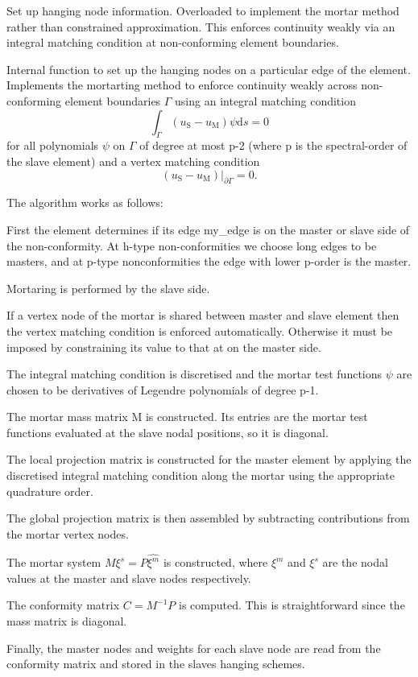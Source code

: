 Set up hanging node information. Overloaded to implement the mortar method rather than constrained approximation. This enforces continuity weakly via an integral matching condition at non-\/conforming element boundaries. 

Internal function to set up the hanging nodes on a particular edge of the element. Implements the mortarting method to enforce continuity weakly across non-\/conforming element boundaries $\Gamma$ using an integral matching condition \[ \int_\Gamma (u_{\mbox{S}} - u_{\mbox{M}}) \psi \mbox{d} s = 0 \] for all polynomials $\psi$ on $\Gamma$ of degree at most p-\/2 (where p is the spectral-\/order of the slave element) and a vertex matching condition \[ (u_{\mbox{S}} - u_{\mbox{M}})\big\vert_{\partial\Gamma} = 0.\]

The algorithm works as follows\+:
\begin{DoxyItemize}
\item First the element determines if its edge my\+\_\+edge is on the master or slave side of the non-\/conformity. At h-\/type non-\/conformities we choose long edges to be masters, and at p-\/type nonconformities the edge with lower p-\/order is the master.
\item Mortaring is performed by the slave side.
\item If a vertex node of the mortar is shared between master and slave element then the vertex matching condition is enforced automatically. Otherwise it must be imposed by constraining its value to that at on the master side.
\item The integral matching condition is discretised and the mortar test functions $ \psi $ are chosen to be derivatives of Legendre polynomials of degree p-\/1.
\item The mortar mass matrix M is constructed. Its entries are the mortar test functions evaluated at the slave nodal positions, so it is diagonal.
\item The local projection matrix is constructed for the master element by applying the discretised integral matching condition along the mortar using the appropriate quadrature order.
\item The global projection matrix is then assembled by subtracting contributions from the mortar vertex nodes.
\item The mortar system $ M\xi^s = P\hat{\xi^m} $ is constructed, where $ \xi^m $ and $ \xi^s $ are the nodal values at the master and slave nodes respectively.
\item The conformity matrix $ C = M^{-1}P $ is computed. This is straightforward since the mass matrix is diagonal.
\item Finally, the master nodes and weights for each slave node are read from the conformity matrix and stored in the slaves\textquotesingle{} hanging schemes.
\end{DoxyItemize}


